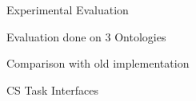 \documentclass[final,hyperref={pdfpagelabels=true}]{beamer}
\begin{document}
\begin{frame}
\begin{columns}[t, onlytextwidth]
\begin{column}{\textwidth}
		
		\begin{columns}[t, onlytextwidth]
			\begin{column}{.49\textwidth}
				\begin{block}{Experimental Evaluation}
					\begin{minipage}[t][.25\textheight][c]{\textwidth}
						\hfill
						\begin{minipage}[t]{0.93\textwidth}
							\begin{minipage}[t]{.5\textwidth}
								\small
								{}\par
								Evaluation done on 3 Ontologies\\
							\end{minipage}
							\begin{minipage}[t]{.5\textwidth}
								\small
								{}\par
								Comparison with old implementation\\
							\end{minipage}
							
							\hrulefill
							
							\begin{minipage}[t]{\textwidth}
								\small
								{CS Task Interfaces}
								

\end{minipage}
\end{minipage}
\end{minipage}
\end{block}
\end{column}
\end{columns}
\end{column}
\end{columns}
\end{frame}
\end{document}
